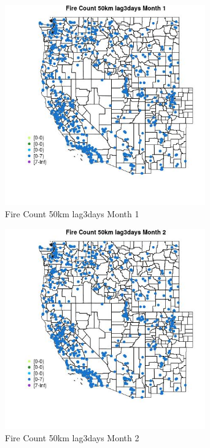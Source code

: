 \begin{figure} 
\centering  
\includegraphics[width=0.77\textwidth]{Code_Outputs/Report_ML_input_PM25_Step4_part_e_de_duplicated_aves_compiled_2019-05-21wNAs_MapObsMo1Fire_Count_50km_lag3days.jpg} 
\caption{\label{fig:Report_ML_input_PM25_Step4_part_e_de_duplicated_aves_compiled_2019-05-21wNAsMapObsMo1Fire_Count_50km_lag3days}Fire Count 50km lag3days Month 1} 
\end{figure} 
 

\clearpage 

\begin{figure} 
\centering  
\includegraphics[width=0.77\textwidth]{Code_Outputs/Report_ML_input_PM25_Step4_part_e_de_duplicated_aves_compiled_2019-05-21wNAs_MapObsMo2Fire_Count_50km_lag3days.jpg} 
\caption{\label{fig:Report_ML_input_PM25_Step4_part_e_de_duplicated_aves_compiled_2019-05-21wNAsMapObsMo2Fire_Count_50km_lag3days}Fire Count 50km lag3days Month 2} 
\end{figure} 
 

